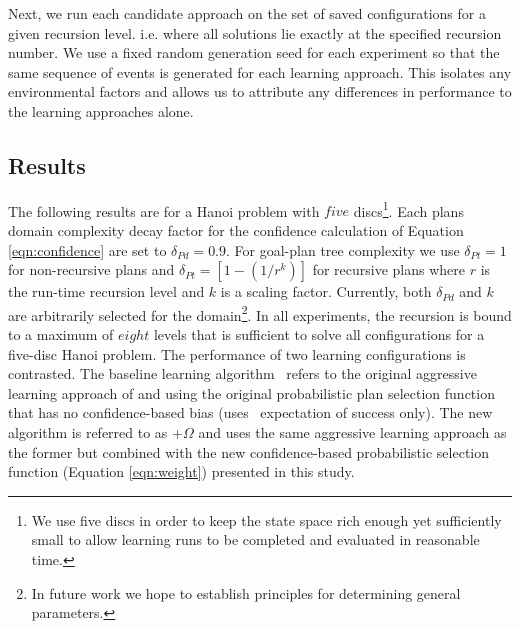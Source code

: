 Next, we run each candidate approach on the set of saved configurations for a given recursion level. i.e. where all solutions lie exactly at the specified recursion number. We use a fixed random generation seed for each experiment so that the same sequence of  events is generated for each learning approach. This isolates any environmental factors and allows us to attribute any differences in performance to the learning approaches alone.


\subsection{Results}

The following results are for a Hanoi problem with $five$ discs\footnote{We use five discs in order to keep the state space rich enough yet sufficiently small to allow learning runs to be completed and evaluated in reasonable time.}. Each plans domain complexity decay factor for the confidence calculation of Equation \ref{eqn:confidence} are set to $\delta_{Pd} = 0.9$. For goal-plan tree complexity we use $\delta_{Pt} =1$ for non-recursive plans and $\delta_{Pt} =\left[1-(1/r^k)\right]$ for recursive plans where $r$ is the run-time recursion level and $k$ is a scaling factor. Currently, both $\delta_{Pd}$ and $k$ are arbitrarily selected for the domain\footnote{In future work we hope to establish principles for determining general parameters.}. In all experiments, the recursion is bound to a maximum of $eight$ levels that is sufficient to solve all configurations for a five-disc Hanoi problem. The performance of two learning configurations is contrasted. The baseline learning algorithm \CL\ refers to the original aggressive learning approach of \cite{Airiau:IJAT:09} and \cite{Singh:AAMAS10} using the original probabilistic plan selection function that has no confidence-based bias (uses \dt\ expectation of success only). The new algorithm is referred to as \CL+$\Omega$ and uses the same aggressive learning approach as the former but combined with the new confidence-based probabilistic selection function (Equation \ref{eqn:weight}) presented in this study.

